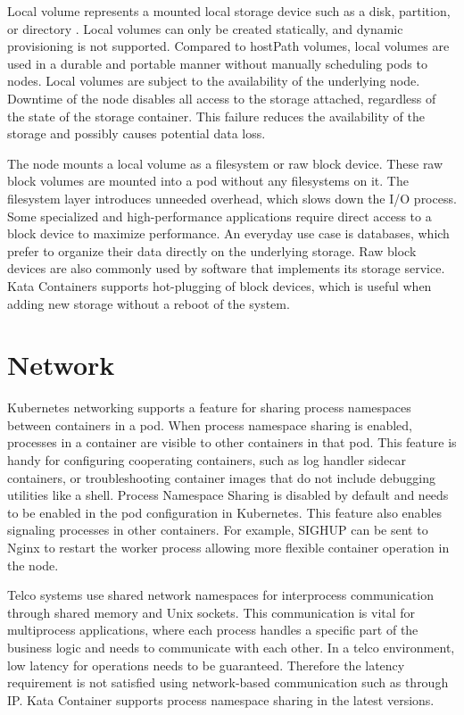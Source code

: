 Local volume represents a mounted local storage device such as a disk, partition, or directory \cite{VolumesKubernetes}. Local volumes can only be created statically, and dynamic provisioning is not supported. Compared to hostPath volumes, local volumes are used in a durable and portable manner without manually scheduling pods to nodes. Local volumes are subject to the availability of the underlying node. Downtime of the node disables all access to the storage attached, regardless of the state of the storage container. This failure reduces the availability of the storage and possibly causes potential data loss.

The node mounts a local volume as a filesystem or raw block device. These raw block volumes are mounted into a pod without any filesystems on it. The filesystem layer introduces unneeded overhead, which slows down the I/O process. Some specialized and high-performance applications require direct access to a block device to maximize performance. An everyday use case is databases, which prefer to organize their data directly on the underlying storage. Raw block devices are also commonly used by software that implements its storage service. Kata Containers supports hot-plugging of block devices, which is useful when adding new storage without a reboot of the system. \cite{RawBlockKubernetes}

\section{Network}

Kubernetes networking supports a feature for sharing process namespaces between containers in a pod. When process namespace sharing is enabled, processes in a container are visible to other containers in that pod. This feature is handy for configuring cooperating containers, such as log handler sidecar containers, or troubleshooting container images that do not include debugging utilities like a shell. Process Namespace Sharing is disabled by default and needs to be enabled in the pod configuration in Kubernetes. This feature also enables signaling processes in other containers. For example, SIGHUP can be sent to Nginx to restart the worker process allowing more flexible container operation in the node. \cite{ShareProcessNamespaceKubernetes}

Telco systems use shared network namespaces for interprocess communication through shared memory and Unix sockets. This communication is vital for multiprocess applications, where each process handles a specific part of the business logic and needs to communicate with each other. In a telco environment, low latency for operations needs to be guaranteed. Therefore the latency requirement is not satisfied using network-based communication such as through IP. Kata Container supports process namespace sharing in the latest versions.

